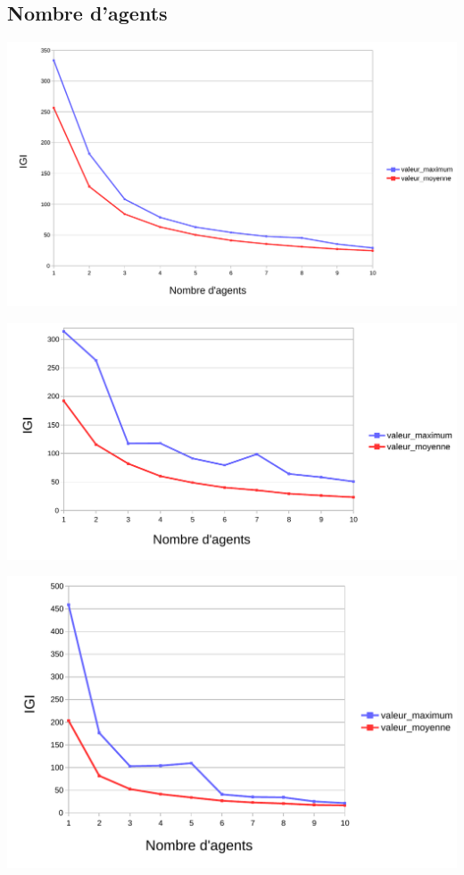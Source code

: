 \documentclass{article}
\begin{document}
    \subsection{Nombre d'agents}
    \begin{center}
        \includegraphics[width = \textwidth]{graphes pdf/variance tortues IGI.pdf}
    \end{center}
    \begin{center}
        \includegraphics[width = \textwidth]{graphes pdf/variance tortues IGI corridor.pdf}
    \end{center}
    \begin{center}
        \includegraphics[width = \textwidth]{graphes pdf/variance tortues IGI spirale.pdf}
    \end{center}
\end{document}
